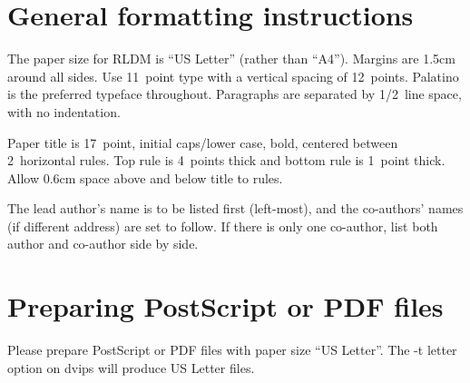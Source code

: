 \documentclass[11pt]{article} %
\begin{document}
\section{General formatting instructions}
\label{gen_inst}

The paper size for RLDM is ``US Letter'' (rather than ``A4''). Margins
are 1.5cm around all sides. Use 11~point type with a vertical spacing
of 12~points. Palatino is the preferred typeface throughout.
Paragraphs are separated by 1/2~line space, with no indentation.

Paper title is 17~point, initial caps/lower case, bold, centered between
2~horizontal rules. Top rule is 4~points thick and bottom rule is 1~point
thick. Allow 0.6cm space above and below title to rules.

The lead author's name is to be listed first (left-most), and
the co-authors' names (if different address) are set to follow. If
there is only one co-author, list both author and co-author side by side.

\section{Preparing PostScript or PDF files}

Please prepare PostScript or PDF files with paper size ``US Letter''.
The -t letter option on dvips will produce US Letter files.
\end{document}

